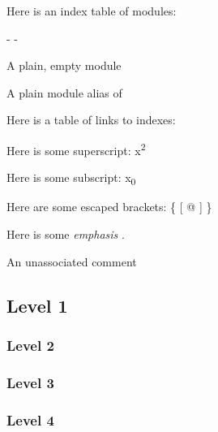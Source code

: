 Here is an index table of  modules:

\begin{description}\kern-\topsep
\makeatletter\advance\@topsepadd-\topsep\makeatother%
\item[{\hyperref[container-page-test-module-Ocamlary-module-Empty]{\ocamlinlinecode{\ocamlinlinecode{Empty}}[p\pageref*{container-page-test-module-Ocamlary-module-Empty}]}}]{A plain, empty module}%
\item[{\hyperref[container-page-test-module-Ocamlary-module-Empty]{\ocamlinlinecode{\ocamlinlinecode{EmptyAlias}}[p\pageref*{container-page-test-module-Ocamlary-module-Empty}]}}]{A plain module alias of }\end{description}%
Here is a table of links to indexes: 

Here is some superscript: x\textsuperscript{2}

Here is some subscript: x\textsubscript{0}

Here are some escaped brackets: \{ [ @ ] \}

Here is some \emph{emphasis} .

An unassociated comment

\subsection{Level 1\label{level-1}}%
\subsubsection{Level 2\label{level-2}}%
\subsubsection{Level 3\label{level-3}}%
\subsubsection{Level 4\label{level-4}}%
